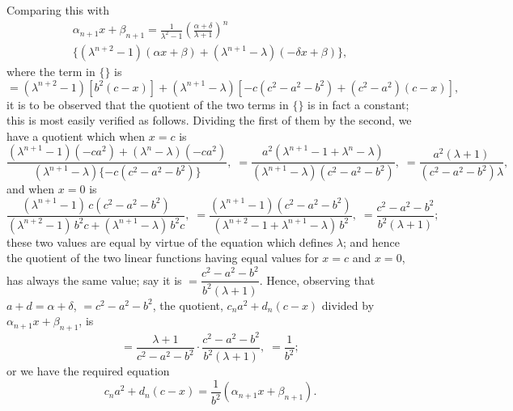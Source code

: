 \documentclass[11pt,a4paper]{book}
\begin{document}
Comparing this with
\begin{multline*}
\alpha_{n+1} x + \beta_{n+1} = \frac{1}{\lambda^2-1}\left(\frac{\alpha+\delta}{\lambda+1}\right)^n\\
\{ (\lambda^{n+2}-1)(\alpha x+\beta) + (\lambda^{n+1}-\lambda)(-\delta x+\beta) \},
\end{multline*}
where the term in $\{\}$ is
\[
= (\lambda^{n+2}-1)[b^2(c-x)] + (\lambda^{n+1}-\lambda)[-c(c^2-a^2-b^2) + (c^2-a^2)(c-x)],
\]
it is to be observed that the quotient of the two terms in $\{\}$ is in fact a constant; this is most easily verified as follows. Dividing the first of them by the second, we have a quotient which when $x=c$ is
\[
\frac{(\lambda^{n+1}-1)(-ca^2) + (\lambda^n-\lambda)(-ca^2)}
     {(\lambda^{n+1}-\lambda)\{-c(c^2-a^2-b^2)\}},\;
= \frac{a^2(\lambda^{n+1}-1+\lambda^n-\lambda)}
       {(\lambda^{n+1}-\lambda)(c^2-a^2-b^2)},\;
= \frac{a^2(\lambda+1)}{(c^2-a^2-b^2)\lambda},
\]
and when $x=0$ is
\[
\frac{(\lambda^{n+1}-1)\,c(c^2-a^2-b^2)}
     {(\lambda^{n+2}-1)\,b^2 c + (\lambda^{n+1}-\lambda)\,b^2 c},\;
= \frac{(\lambda^{n+1}-1)(c^2-a^2-b^2)}
       {(\lambda^{n+2}-1+\lambda^{n+1}-\lambda)\,b^2},\;
= \frac{c^2-a^2-b^2}{b^2(\lambda+1)};
\]
these two values are equal by virtue of the equation which defines $\lambda$; and hence the quotient of the two linear functions having equal values for $x=c$ and $x=0$, has always the same value; say it is $= \dfrac{c^2-a^2-b^2}{b^2(\lambda+1)}$. Hence, observing that $a+d = \alpha+\delta$, $= c^2-a^2-b^2$, the quotient, $c_n a^2 + d_n(c-x)$ divided by $\alpha_{n+1} x + \beta_{n+1}$, is
\[
= \frac{\lambda+1}{c^2-a^2-b^2} \cdot \frac{c^2-a^2-b^2}{b^2(\lambda+1)},\; = \frac{1}{b^2};
\]
or we have the required equation
\[
c_n a^2 + d_n(c-x) = \frac{1}{b^2}(\alpha_{n+1} x + \beta_{n+1}).
\]
\end{document}
